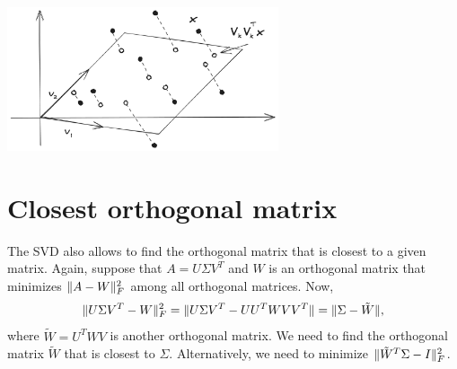 \documentclass{article}
\begin{document}
\begin{center}
\includegraphics[width=0.6\textwidth]{images/pca.png}
\end{center}


\section{Closest orthogonal matrix}
The SVD also allows to find the orthogonal matrix that is closest to
a given matrix. Again, suppose that $A = U \Sigma V^{T}$ and $W$ is
an orthogonal matrix that minimizes $\| A-W \|^{2}_{F}$ among all
orthogonal matrices. Now,
\begin{equation*}
\| U \Sigma V^{T} - W \|_{F}^{2} = \| U \Sigma V^{T} - UU^{T} W
VV^{T} \| = \| \Sigma - \tilde{W} \|,
\end{equation*}
where $\tilde{W}=U^{T} W V$ is another orthogonal matrix. We need to
find the orthogonal matrix $\tilde{W}$ that is closest to $\Sigma$.
Alternatively, we need to minimize $\| \tilde{W}^{T} \Sigma -
I \|_{F}^{2}$.
\end{document}
